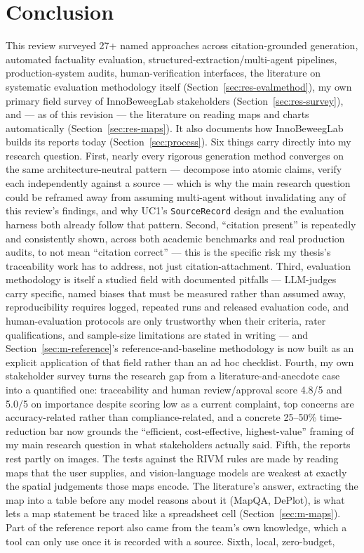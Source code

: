 \section{Conclusion}\label{sec:conclusion}

This review surveyed 27+ named approaches across citation-grounded generation, automated factuality evaluation, structured-extraction/multi-agent pipelines, production-system audits, human-verification interfaces, the literature on systematic evaluation methodology itself (Section~\ref{sec:res-evalmethod}), my own primary field survey of InnoBeweegLab stakeholders (Section~\ref{sec:res-survey}), and — as of this revision — the literature on reading maps and charts automatically (Section~\ref{sec:res-maps}). It also documents how InnoBeweegLab builds its reports today (Section~\ref{sec:process}). Six things carry directly into my research question. First, nearly every rigorous generation method converges on the same architecture-neutral pattern — decompose into atomic claims, verify each independently against a source — which is why the main research question could be reframed away from assuming multi-agent without invalidating any of this review's findings, and why UC1's \texttt{SourceRecord} design and the evaluation harness both already follow that pattern. Second, \textquotedblleft{}citation present\textquotedblright{} is repeatedly and consistently shown, across both academic benchmarks and real production audits, to not mean \textquotedblleft{}citation correct\textquotedblright{} — this is the specific risk my thesis's traceability work has to address, not just citation-attachment. Third, evaluation methodology is itself a studied field with documented pitfalls — LLM-judges carry specific, named biases that must be measured rather than assumed away, reproducibility requires logged, repeated runs and released evaluation code, and human-evaluation protocols are only trustworthy when their criteria, rater qualifications, and sample-size limitations are stated in writing — and Section~\ref{sec:m-reference}'s reference-and-baseline methodology is now built as an explicit application of that field rather than an ad hoc checklist. Fourth, my own stakeholder survey turns the research gap from a literature-and-anecdote case into a quantified one: traceability and human review/approval score 4.8/5 and 5.0/5 on importance despite scoring low as a current complaint, top concerns are accuracy-related rather than compliance-related, and a concrete 25–50\% time-reduction bar now grounds the \textquotedblleft{}efficient, cost-effective, highest-value\textquotedblright{} framing of my main research question in what stakeholders actually said. Fifth, the reports rest partly on images. The tests against the RIVM rules are made by reading maps that the user supplies, and vision-language models are weakest at exactly the spatial judgements those maps encode. The literature's answer, extracting the map into a table before any model reasons about it (MapQA, DePlot), is what lets a map statement be traced like a spreadsheet cell (Section~\ref{sec:m-maps}). Part of the reference report also came from the team's own knowledge, which a tool can only use once it is recorded with a source. Sixth, local, zero-budget, 